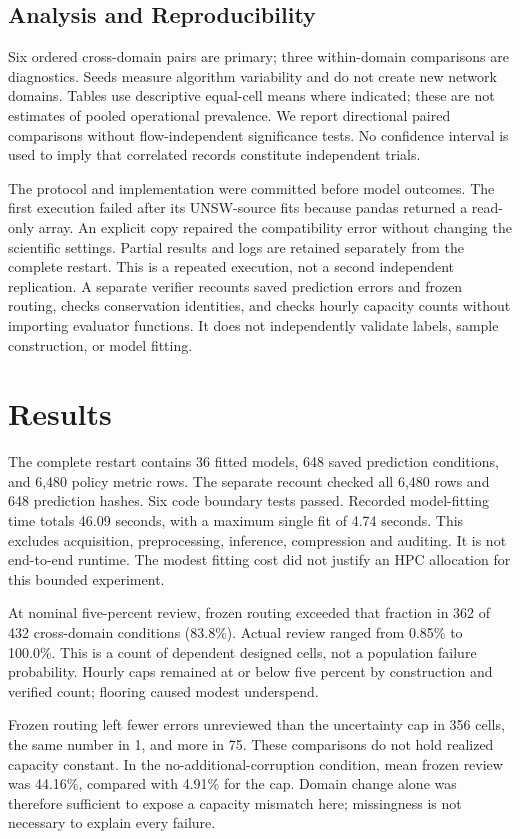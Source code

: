 \documentclass[manuscript,screen,nonacm]{acmart}
\begin{document}
\subsection{Analysis and Reproducibility}
Six ordered cross-domain pairs are primary; three within-domain comparisons are diagnostics. Seeds measure algorithm variability and do not create new network domains. Tables use descriptive equal-cell means where indicated; these are not estimates of pooled operational prevalence. We report directional paired comparisons without flow-independent significance tests. No confidence interval is used to imply that correlated records constitute independent trials.

The protocol and implementation were committed before model outcomes. The first execution failed after its UNSW-source fits because pandas returned a read-only array. An explicit copy repaired the compatibility error without changing the scientific settings. Partial results and logs are retained separately from the complete restart. This is a repeated execution, not a second independent replication. A separate verifier recounts saved prediction errors and frozen routing, checks conservation identities, and checks hourly capacity counts without importing evaluator functions. It does not independently validate labels, sample construction, or model fitting.

\section{Results}
The complete restart contains 36 fitted models, 648 saved prediction conditions, and 6,480 policy metric rows. The separate recount checked all 6,480 rows and 648 prediction hashes. Six code boundary tests passed. Recorded model-fitting time totals 46.09 seconds, with a maximum single fit of 4.74 seconds. This excludes acquisition, preprocessing, inference, compression and auditing. It is not end-to-end runtime. The modest fitting cost did not justify an HPC allocation for this bounded experiment.

At nominal five-percent review, frozen routing exceeded that fraction in 362 of 432 cross-domain conditions (83.8\%). Actual review ranged from 0.85\% to 100.0\%. This is a count of dependent designed cells, not a population failure probability. Hourly caps remained at or below five percent by construction and verified count; flooring caused modest underspend.

Frozen routing left fewer errors unreviewed than the uncertainty cap in 356 cells, the same number in 1, and more in 75. These comparisons do not hold realized capacity constant. In the no-additional-corruption condition, mean frozen review was 44.16\%, compared with 4.91\% for the cap. Domain change alone was therefore sufficient to expose a capacity mismatch here; missingness is not necessary to explain every failure.
\end{document}
